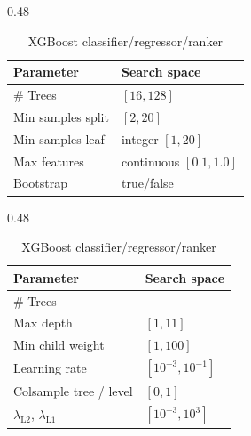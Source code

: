 \begin{table}[!htbp]
  \medskip
  \begin{subtable}[t]{0.48\textwidth}
    \centering
    \caption{\gls{rf} classifier/regressor}
    \begin{tabularx}{\linewidth}{@{}>{\RaggedRight\arraybackslash}X>{\RaggedRight\arraybackslash}p{.40\linewidth}@{}}
      \toprule
      Parameter & Search space \\
      \midrule
      \# Trees &  $[16,128]$\\
      Min samples split & $[2,20]$ \\
      Min samples leaf & integer $[1,20]$ \\
      Max features & continuous $[0.1,1.0]$ \\
      Bootstrap & true/false \\
      \bottomrule
    \end{tabularx}\end{subtable}\hfill
\begin{subtable}[t]{0.48\textwidth}
    \centering
    \caption{XGBoost classifier/regressor/ranker}
    \begin{tabularx}{\linewidth}{@{}>{\RaggedRight\arraybackslash}X>{\RaggedRight\arraybackslash}p{.40\linewidth}@{}}
      \toprule
      Parameter & Search space \\
      \midrule
      \# Trees &  2000  \\
      Max depth & $[1,11]$ \\
      Min child weight & $[1,100]$  \\
      Learning rate & $[10^{-3},10^{-1}]$ \\
      Colsample tree / level & $[0,1]$ \\
      $\lambda_{\mathrm{L2}}$, $\lambda_{\mathrm{L1}}$ & $[10^{-3},10^3]$ \\
      \bottomrule
    \end{tabularx}\end{subtable}
\end{table}


